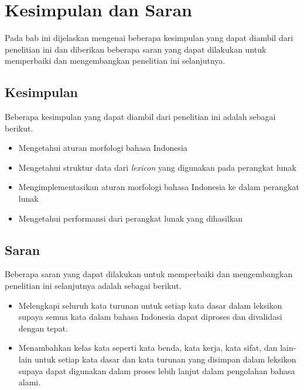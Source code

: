 \chapter{Kesimpulan dan Saran}
\label{chap:kesimpulanDanSaran}

Pada bab ini dijelaskan mengenai beberapa kesimpulan yang dapat diambil dari penelitian ini dan diberikan beberapa saran yang dapat dilakukan untuk memperbaiki dan mengembangkan penelitian ini selanjutnya.

\section{Kesimpulan}
\label{sec:kesimpulan}

Beberapa kesimpulan yang dapat diambil dari penelitian ini adalah sebagai berikut.

\begin{itemize}
	\item Mengetahui aturan morfologi bahasa Indonesia
	\item Mengetahui struktur data dari {\it lexicon} yang digunakan pada perangkat lunak
	\item Mengimplementasikan aturan morfologi bahasa Indonesia ke dalam perangkat lunak
	\item Mengetahui performansi dari perangkat lunak yang dihasilkan
\end{itemize}


\section{Saran}
\label{sec:saran}

Beberapa saran yang dapat dilakukan untuk memperbaiki dan mengembangkan penelitian ini selanjutnya adalah sebagai berikut.

\begin{itemize}
	\item Melengkapi seluruh kata turunan untuk setiap kata dasar dalam leksikon supaya semua kata dalam bahasa Indonesia dapat diproses dan divalidasi dengan tepat.
	\item Menambahkan kelas kata seperti kata benda, kata kerja, kata sifat, dan lain-lain untuk setiap kata dasar dan kata turunan yang disimpan dalam leksikon supaya dapat digunakan dalam proses lebih lanjut dalam pengolahan bahasa alami.
\end{itemize}